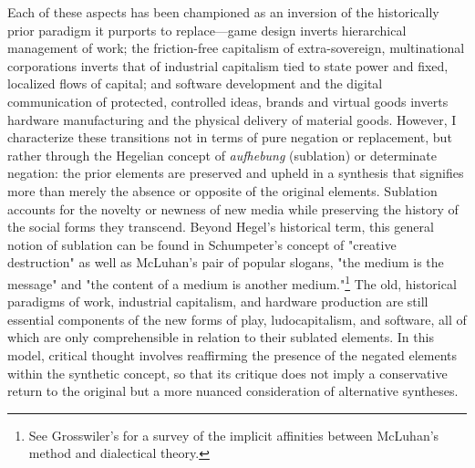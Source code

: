 Each of these aspects has been championed as an inversion of the historically prior paradigm it purports to replace---game design inverts hierarchical management of work; the friction-free capitalism of extra-sovereign, multinational corporations inverts that of industrial capitalism tied to state power and fixed, localized flows of capital; and software development and the digital communication of protected, controlled ideas, brands and virtual goods inverts hardware manufacturing and the physical delivery of material goods. However, I characterize these transitions not in terms of pure negation or replacement, but rather through the Hegelian concept of \emph{aufhebung} (sublation) or determinate negation: the prior elements are preserved and upheld in a synthesis that signifies more than merely the absence or opposite of the original elements. Sublation accounts for the novelty or newness of new media while preserving the history of the social forms they transcend. Beyond Hegel's historical term, this general notion of sublation can be found in Schumpeter's concept of "creative destruction" as well as McLuhan's pair of popular slogans, "the medium is the message" and "the content of a medium is another medium."\footnote{
  See Grosswiler's  for a survey of the implicit affinities between McLuhan's method and dialectical theory.
} The old, historical paradigms of work, industrial capitalism, and hardware production are still essential components of the new forms of play, ludocapitalism, and software, all of which are only comprehensible in relation to their sublated elements. In this model, critical thought involves reaffirming the presence of the negated elements within the synthetic concept, so that its critique does not imply a conservative return to the original but a more nuanced consideration of alternative syntheses.

